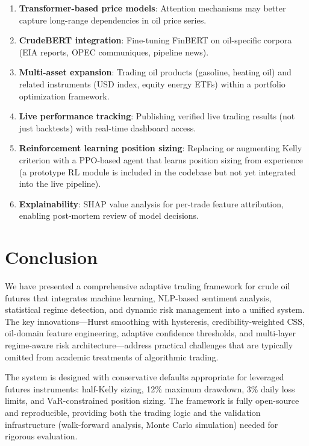 \documentclass[12pt,a4paper]{article}
\begin{document}
\begin{enumerate}[leftmargin=*]
    \item \textbf{Transformer-based price models}: Attention mechanisms may better capture long-range dependencies in oil price series.

    \item \textbf{CrudeBERT integration}: Fine-tuning FinBERT on oil-specific corpora (EIA reports, OPEC communiques, pipeline news).

    \item \textbf{Multi-asset expansion}: Trading oil products (gasoline, heating oil) and related instruments (USD index, equity energy ETFs) within a portfolio optimization framework.

    \item \textbf{Live performance tracking}: Publishing verified live trading results (not just backtests) with real-time dashboard access.

    \item \textbf{Reinforcement learning position sizing}: Replacing or augmenting Kelly criterion with a PPO-based agent that learns position sizing from experience (a prototype RL module is included in the codebase but not yet integrated into the live pipeline).

    \item \textbf{Explainability}: SHAP value analysis for per-trade feature attribution, enabling post-mortem review of model decisions.
\end{enumerate}

\section{Conclusion}
\label{sec:conclusion}

We have presented a comprehensive adaptive trading framework for crude oil futures that integrates machine learning, NLP-based sentiment analysis, statistical regime detection, and dynamic risk management into a unified system. The key innovations---Hurst smoothing with hysteresis, credibility-weighted CSS, oil-domain feature engineering, adaptive confidence thresholds, and multi-layer regime-aware risk architecture---address practical challenges that are typically omitted from academic treatments of algorithmic trading.

The system is designed with conservative defaults appropriate for leveraged futures instruments: half-Kelly sizing, 12\% maximum drawdown, 3\% daily loss limits, and VaR-constrained position sizing. The framework is fully open-source and reproducible, providing both the trading logic and the validation infrastructure (walk-forward analysis, Monte Carlo simulation) needed for rigorous evaluation.
\end{document}
